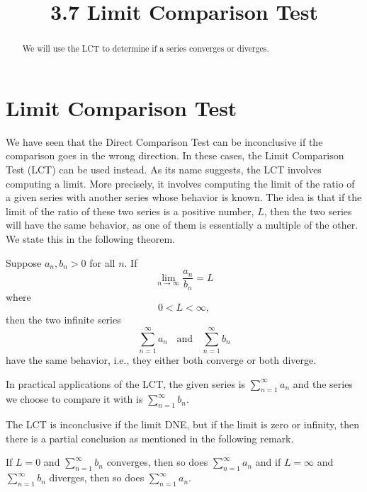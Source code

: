 \documentclass[handout]{ximera}
\title{3.7 Limit Comparison Test}
\begin{document}
\begin{abstract}
We will use the LCT to determine if a series converges or diverges.
\end{abstract}

\maketitle

\section{Limit Comparison Test}
We have seen that the Direct Comparison Test can be inconclusive if the comparison goes in the wrong direction. 
In these cases, the Limit Comparison Test (LCT) can be used instead.
As its name suggests, the LCT involves computing a limit. More precisely, it involves computing the limit of the ratio of a given series with 
another series whose behavior is known.  The idea is that if the limit of the ratio of these two series is a positive number, $L$, then the two series
will have the same behavior, as one of them is essentially a multiple of the other. We state this in the following theorem.

\begin{theorem}
Suppose $a_n, b_n > 0$ for all $n$.
If 
\[
\lim_{n \to \infty} \frac{a_n}{b_n} = L
\]
where
\[
0<L<\infty,
\]
then the two infinite series 
\[
\sum_{n=1}^\infty a_n \;\; \text{ and } \;\; \sum_{n=1}^\infty b_n
\]
have the same behavior, i.e., they either both converge or both diverge.
\end{theorem}


\begin{remark}
In practical applications of the LCT, the given series is $\displaystyle{\sum_{n=1}^\infty a_n}$
and the series we choose to compare it with is $\displaystyle{\sum_{n=1}^\infty b_n}$.
\end{remark}

The LCT is inconclusive if the limit DNE, but if the limit is zero or infinity, then there is a partial conclusion as mentioned in the following remark.

\begin{remark}
If $L = 0$ and $\displaystyle{\sum_{n=1}^\infty b_n}$ converges, 
then so does $\displaystyle{\sum_{n=1}^\infty a_n}$
and if $L = \infty$ and $\displaystyle{\sum_{n=1}^\infty b_n}$ diverges, 
then so does $\displaystyle{\sum_{n=1}^\infty a_n}$.
\end{remark}
\end{document}
